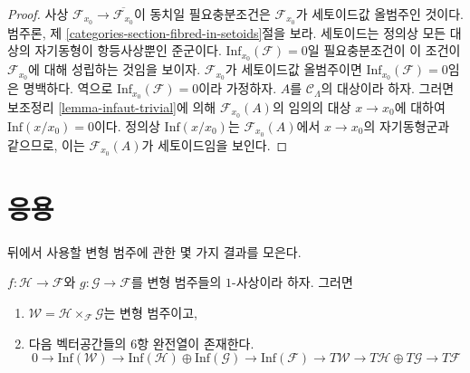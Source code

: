 \begin{proof}
사상 $\mathcal{F}_{x_0} \to \overline{\mathcal{F}_{x_0}}$이 동치일
필요충분조건은 $\mathcal{F}_{x_0}$가 세토이드값 올범주인 것이다.
범주론, 제 \ref{categories-section-fibred-in-setoids}절을 보라.
세토이드는 정의상 모든 대상의 자기동형이 항등사상뿐인 준군이다.
$\text{Inf}_{x_0}(\mathcal{F}) = 0$일 필요충분조건이 이 조건이
$\mathcal{F}_{x_0}$에 대해 성립하는 것임을 보이자.
$\mathcal{F}_{x_0}$가 세토이드값 올범주이면
$\text{Inf}_{x_0}(\mathcal{F}) = 0$임은 명백하다. 역으로
$\text{Inf}_{x_0}(\mathcal{F}) = 0$이라 가정하자. $A$를
$\mathcal{C}_\Lambda$의 대상이라 하자. 그러면 보조정리
\ref{lemma-infaut-trivial}에 의해 $\mathcal{F}_{x_0}(A)$의 임의의 대상
$x \to x_0$에 대하여 $\text{Inf}(x/x_0) = 0$이다. 정의상
$\text{Inf}(x/x_0)$는 $\mathcal{F}_{x_0}(A)$에서 $x \to x_0$의
자기동형군과 같으므로, 이는 $\mathcal{F}_{x_0}(A)$가 세토이드임을 보인다.
\end{proof}

\section{응용}
\label{section-applications}

\noindent
뒤에서 사용할 변형 범주에 관한 몇 가지 결과를 모은다.

\begin{lemma}
\label{lemma-deformation-categories-fiber-product-morphisms}
$f : \mathcal{H} \to \mathcal{F}$와 $g : \mathcal{G} \to \mathcal{F}$를
변형 범주들의 $1$-사상이라 하자. 그러면
\begin{enumerate}
\item $\mathcal{W} = \mathcal{H} \times_\mathcal{F} \mathcal{G}$는
변형 범주이고,
\item 다음 벡터공간들의 $6$항 완전열이 존재한다.
$$
0 \to \text{Inf}(\mathcal{W})
\to \text{Inf}(\mathcal{H}) \oplus \text{Inf}(\mathcal{G})
\to \text{Inf}(\mathcal{F}) \to
T\mathcal{W} \to T\mathcal{H} \oplus T\mathcal{G} \to T\mathcal{F}
$$
\end{enumerate}
\end{lemma}

